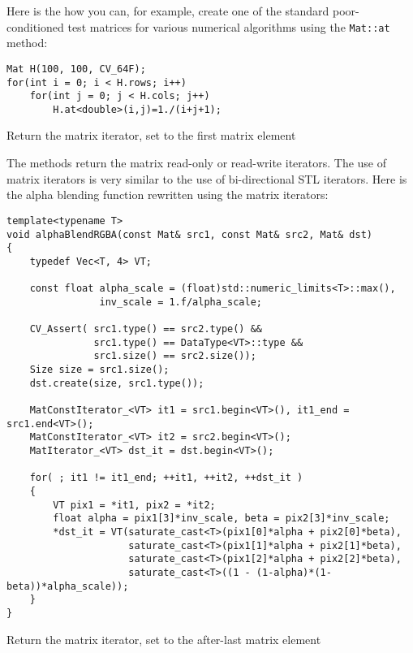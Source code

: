 Here is the how you can, for example, create one of the standard poor-conditioned test matrices for various numerical algorithms using the \texttt{Mat::at} method:

\begin{lstlisting}
Mat H(100, 100, CV_64F);
for(int i = 0; i < H.rows; i++)
    for(int j = 0; j < H.cols; j++)
        H.at<double>(i,j)=1./(i+j+1);
\end{lstlisting}

Return the matrix iterator, set to the first matrix element


The methods return the matrix read-only or read-write iterators. The use of matrix iterators is very similar to the use of bi-directional STL iterators. Here is the alpha blending function rewritten using the matrix iterators:

\begin{lstlisting}
template<typename T>
void alphaBlendRGBA(const Mat& src1, const Mat& src2, Mat& dst)
{
    typedef Vec<T, 4> VT;
    
    const float alpha_scale = (float)std::numeric_limits<T>::max(),
                inv_scale = 1.f/alpha_scale;
    
    CV_Assert( src1.type() == src2.type() &&
               src1.type() == DataType<VT>::type &&
               src1.size() == src2.size());
    Size size = src1.size();
    dst.create(size, src1.type());
    
    MatConstIterator_<VT> it1 = src1.begin<VT>(), it1_end = src1.end<VT>();
    MatConstIterator_<VT> it2 = src2.begin<VT>();
    MatIterator_<VT> dst_it = dst.begin<VT>();
    
    for( ; it1 != it1_end; ++it1, ++it2, ++dst_it )
    {
        VT pix1 = *it1, pix2 = *it2;
        float alpha = pix1[3]*inv_scale, beta = pix2[3]*inv_scale;
        *dst_it = VT(saturate_cast<T>(pix1[0]*alpha + pix2[0]*beta),
                     saturate_cast<T>(pix1[1]*alpha + pix2[1]*beta),
                     saturate_cast<T>(pix1[2]*alpha + pix2[2]*beta),
                     saturate_cast<T>((1 - (1-alpha)*(1-beta))*alpha_scale));
    }
}
\end{lstlisting}


Return the matrix iterator, set to the after-last matrix element


